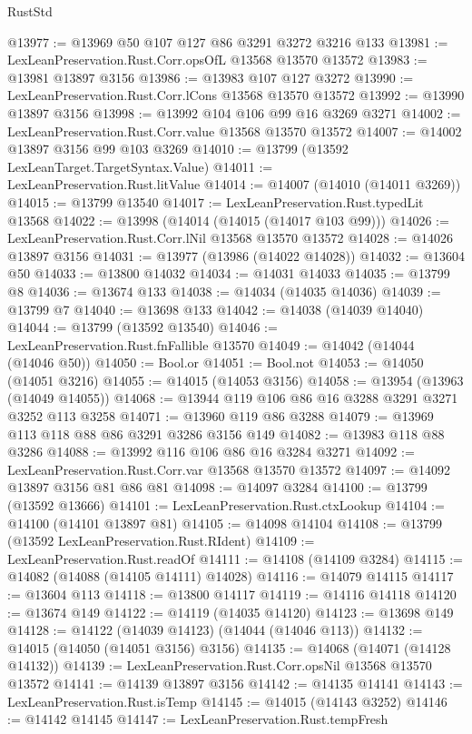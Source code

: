\begin{lexlean}{RustStd}
\begin{coremodule}
@13977 := @13969 @50 @107 @127 @86 @3291 @3272 @3216 @133
@13981 := LexLeanPreservation.Rust.Corr.opsOfL @13568 @13570 @13572
@13983 := @13981 @13897 @3156
@13986 := @13983 @107 @127 @3272
@13990 := LexLeanPreservation.Rust.Corr.lCons @13568 @13570 @13572
@13992 := @13990 @13897 @3156
@13998 := @13992 @104 @106 @99 @16 @3269 @3271
@14002 := LexLeanPreservation.Rust.Corr.value @13568 @13570 @13572
@14007 := @14002 @13897 @3156 @99 @103 @3269
@14010 := @13799 (@13592 LexLeanTarget.TargetSyntax.Value)
@14011 := LexLeanPreservation.Rust.litValue
@14014 := @14007 (@14010 (@14011 @3269))
@14015 := @13799 @13540
@14017 := LexLeanPreservation.Rust.typedLit @13568
@14022 := @13998 (@14014 (@14015 (@14017 @103 @99)))
@14026 := LexLeanPreservation.Rust.Corr.lNil @13568 @13570 @13572
@14028 := @14026 @13897 @3156
@14031 := @13977 (@13986 (@14022 @14028))
@14032 := @13604 @50
@14033 := @13800 @14032
@14034 := @14031 @14033
@14035 := @13799 @8
@14036 := @13674 @133
@14038 := @14034 (@14035 @14036)
@14039 := @13799 @7
@14040 := @13698 @133
@14042 := @14038 (@14039 @14040)
@14044 := @13799 (@13592 @13540)
@14046 := LexLeanPreservation.Rust.fnFallible @13570
@14049 := @14042 (@14044 (@14046 @50))
@14050 := Bool.or
@14051 := Bool.not
@14053 := @14050 (@14051 @3216)
@14055 := @14015 (@14053 @3156)
@14058 := @13954 (@13963 (@14049 @14055))
@14068 := @13944 @119 @106 @86 @16 @3288 @3291 @3271 @3252 @113 @3258
@14071 := @13960 @119 @86 @3288
@14079 := @13969 @113 @118 @88 @86 @3291 @3286 @3156 @149
@14082 := @13983 @118 @88 @3286
@14088 := @13992 @116 @106 @86 @16 @3284 @3271
@14092 := LexLeanPreservation.Rust.Corr.var @13568 @13570 @13572
@14097 := @14092 @13897 @3156 @81 @86 @81
@14098 := @14097 @3284
@14100 := @13799 (@13592 @13666)
@14101 := LexLeanPreservation.Rust.ctxLookup
@14104 := @14100 (@14101 @13897 @81)
@14105 := @14098 @14104
@14108 := @13799 (@13592 LexLeanPreservation.Rust.RIdent)
@14109 := LexLeanPreservation.Rust.readOf
@14111 := @14108 (@14109 @3284)
@14115 := @14082 (@14088 (@14105 @14111) @14028)
@14116 := @14079 @14115
@14117 := @13604 @113
@14118 := @13800 @14117
@14119 := @14116 @14118
@14120 := @13674 @149
@14122 := @14119 (@14035 @14120)
@14123 := @13698 @149
@14128 := @14122 (@14039 @14123) (@14044 (@14046 @113))
@14132 := @14015 (@14050 (@14051 @3156) @3156)
@14135 := @14068 (@14071 (@14128 @14132))
@14139 := LexLeanPreservation.Rust.Corr.opsNil @13568 @13570 @13572
@14141 := @14139 @13897 @3156
@14142 := @14135 @14141
@14143 := LexLeanPreservation.Rust.isTemp
@14145 := @14015 (@14143 @3252)
@14146 := @14142 @14145
@14147 := LexLeanPreservation.Rust.tempFresh

\end{coremodule}
\end{lexlean}
